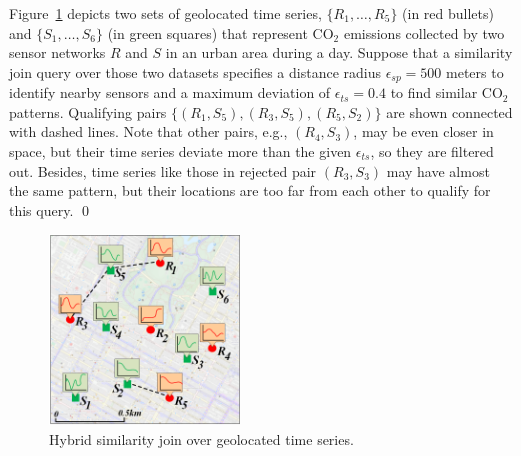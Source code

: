 \begin{myexample}
Figure~\ref{fig:simjoin_example} depicts two sets of geolocated time series, $\{R_1, \dots, R_5\}$ (in red bullets) and $\{S_1, \dots, S_6\}$ (in green squares) that represent CO$_2$ emissions collected by two sensor networks $R$ and $S$ in an urban area during a day. Suppose that a similarity join query over those two datasets specifies a distance radius $\epsilon_{sp} = 500$ meters to identify nearby sensors and a maximum deviation of $\epsilon_{ts} = 0.4$ to find similar CO$_2$ patterns. Qualifying pairs  $\{ (R_1, S_5), (R_3, S_5),  (R_5, S_2) \}$ are shown connected with dashed lines. Note that other pairs, e.g., $(R_4, S_3)$, may be even closer in space, but their time series deviate more than the given $\epsilon_{ts}$, so they are filtered out. Besides, time series like those in rejected pair $(R_3, S_3)$ may have almost the same pattern, but their locations are too far from each other to qualify for this query.
\qed
\end{myexample}

\begin{figure}[!ht]
 \centering
 \includegraphics[width=0.45\textwidth]{figures/sim_join.png}
 \caption{Hybrid similarity join over geolocated time series.}
\label{fig:simjoin_example}
\end{figure}
